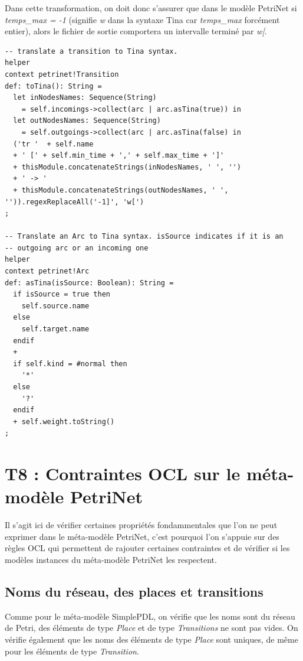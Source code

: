 \documentclass{report}
\begin{document}
Dans cette transformation, on doit donc s'assurer que dans le modèle PetriNet si \textit{temps\_max = -1} (signifie \textit{w} dans la syntaxe Tina car \textit{temps\_max} forcément entier), alors le fichier de sortie comportera un intervalle terminé par \textit{w[}.\\

\begin{verbatim}
-- translate a transition to Tina syntax.
helper
context petrinet!Transition
def: toTina(): String =
  let inNodesNames: Sequence(String)
    = self.incomings->collect(arc | arc.asTina(true)) in
  let outNodesNames: Sequence(String)
    = self.outgoings->collect(arc | arc.asTina(false) in
  ('tr '  + self.name
  + ' [' + self.min_time + ',' + self.max_time + ']'
  + thisModule.concatenateStrings(inNodesNames, ' ', '')
  + ' -> '
  + thisModule.concatenateStrings(outNodesNames, ' ', '')).regexReplaceAll('-1]', 'w[')
;
		
-- Translate an Arc to Tina syntax. isSource indicates if it is an
-- outgoing arc or an incoming one
helper
context petrinet!Arc
def: asTina(isSource: Boolean): String =
  if isSource = true then
    self.source.name
  else
    self.target.name
  endif
  +
  if self.kind = #normal then
    '*'
  else
    '?'
  endif
  + self.weight.toString()
;
\end{verbatim}

\section{T8 : Contraintes OCL sur le méta-modèle PetriNet}
Il s'agit ici de vérifier certaines propriétés fondammentales que l'on ne peut exprimer dans le méta-modèle PetriNet, c'est pourquoi l'on s'appuie sur des règles OCL qui permettent de rajouter certaines contraintes et de vérifier si les modèles instances du méta-modèle PetriNet les respectent.\\

\subsection{Noms du réseau, des places et transitions}
Comme pour le méta-modèle SimplePDL, on vérifie que les noms sont du réseau de Petri, des éléments de type \textit{Place} et de type \textit{Transitions} ne sont pas vides. On vérifie également que les noms des éléments de type \textit{Place} sont uniques, de même pour les éléments de type \textit{Transition}.
\end{document}

